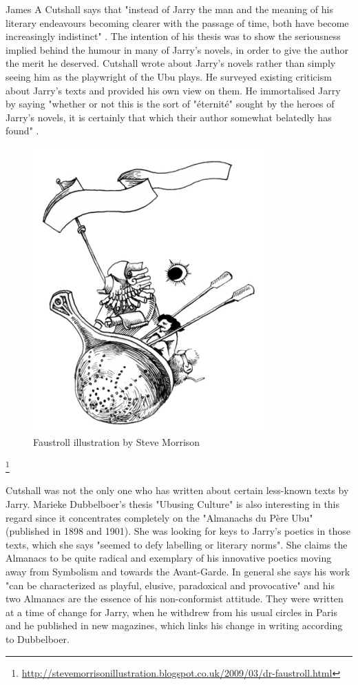 James A Cutshall says that "instead of Jarry the man and the meaning of his literary endeavours becoming clearer with the passage of time, both have become increasingly indistinct" \citep[p.246]{Cutshall1988}. The intention of his thesis was to show the seriousness implied behind the humour in many of Jarry's novels, in order to give the author the merit he deserved. Cutshall wrote about Jarry's novels rather than simply seeing him as the playwright of the Ubu plays. He surveyed existing criticism about Jarry's texts and provided his own view on them. He immortalised Jarry by saying "whether or not this is the sort of "éternité" sought by the heroes of Jarry's novels, it is certainly that which their author somewhat belatedly has found" \citep[p.248]{Cutshall1988}.

\begin{figure}[htb]
  \centering
  \includegraphics[height=0.3\textheight]{images/faustroll}
  \caption[Faustroll]{Faustroll illustration by Steve Morrison}
  \label{fig:FAUSTROLL}
\end{figure}\footnote{\url{http://stevemorrisonillustration.blogspot.co.uk/2009/03/dr-faustroll.html}}

Cutshall was not the only one who has written about certain less-known texts by Jarry. Marieke Dubbelboer's thesis "Ubusing Culture" is also interesting in this regard since it concentrates completely on the "Almanachs du Père Ubu" (published in 1898 and 1901)\citep{Dubbelboer2009}. She was looking for keys to Jarry's poetics in those texts, which she says "seemed to defy labelling or literary norms"\citep[p.10]{Dubbelboer2009}. She claims the Almanacs to be quite radical and exemplary of his innovative poetics moving away from Symbolism and towards the Avant-Garde. In general she says his work "can be characterized as playful, elusive, paradoxical and provocative"\citep[p.197]{Dubbelboer2009} and his two Almanacs are the essence of his non-conformist attitude. They were written at a time of change for Jarry, when he withdrew from his usual circles in Paris and he published in new magazines, which links his change in writing according to Dubbelboer.

